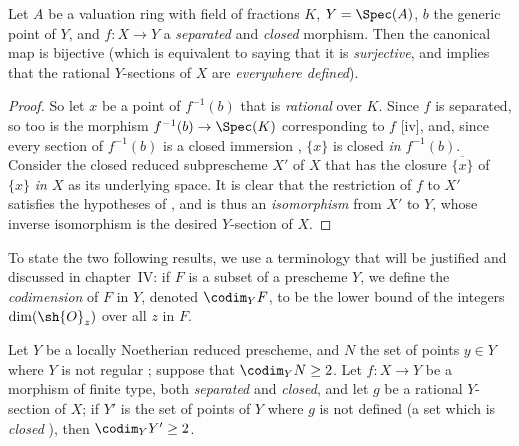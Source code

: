 \begin{proposition}[7.3.3]
\label{II.7.3.3}
Let $A$ be a valuation ring with field of fractions $K$, $Y=\Spec(A)$, $b$ the generic point of $Y$, and $f:X\to Y$ a \emph{separated} and \emph{closed} morphism.
Then the canonical map  is bijective (which is equivalent to saying that it is \emph{surjective}, and implies that the rational $Y$-sections of $X$ are \emph{everywhere defined}).
\end{proposition}

\begin{proof}
So let $x$ be a point of $f^{-1}(b)$ that is \emph{rational} over $K$.
Since $f$ is separated, so too is the morphism $f^{-1}(b)\to\Spec(K)$ corresponding to $f$ [iv], and, since every section of $f^{-1}(b)$ is a closed immersion , $\{x\}$ is closed \emph{in $f^{-1}(b)$}.
Consider the closed reduced subprescheme $X'$ of $X$ that has the closure $\overline{\{x\}}$ of $\{x\}$ \emph{in $X$} as its underlying space.
It is clear that the restriction of $f$ to $X'$ satisfies the hypotheses of , and is thus an \emph{isomorphism} from $X'$ to $Y$, whose inverse isomorphism is the desired $Y$-section of $X$.
\end{proof}

\begin{env}[7.3.4]
\label{II.7.3.4}
To state the two following results, we use a terminology that will be justified and discussed in chapter~IV: if $F$ is a subset
of a prescheme $Y$, we define the \emph{codimension} of $F$ in $Y$, denoted $\codim_Y F$, to be the lower bound of the integers $\dim(\sh{O}_z)$ over all $z$ in $F$.
\end{env}

\begin{corollary}[7.3.5]
\label{II.7.3.5}
Let $Y$ be a locally Noetherian reduced prescheme, and $N$ the set of points $y\in Y$ where $Y$ is not regular ;
suppose that $\codim_Y N\geq2$.
Let $f:X\to Y$ be a morphism of finite type, both \emph{separated} and \emph{closed}, and let $g$ be a rational $Y$-section of $X$;
if $Y'$ is the set of points of $Y$ where $g$ is not defined (a set which is \emph{closed} ), then $\codim_Y Y'\geq2$.
\end{corollary}


